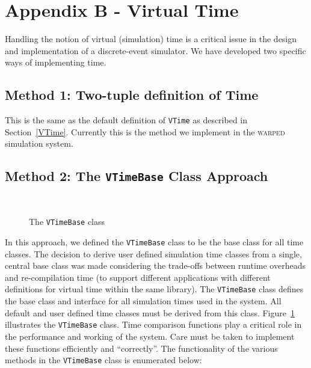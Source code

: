 \documentclass[11pt]{article}
\begin{document}
\newpage
\section*{Appendix B - Virtual Time}\label{vtime}

Handling the notion of virtual (simulation) time is a critical issue in
the design and implementation of a discrete-event simulator. We have
developed two specific ways of implementing time.

\subsection*{Method 1: Two-tuple definition of Time}

This is the same as the default definition of {\tt VTime} as described in
Section~\ref{VTime}. Currently this is the method we implement in the
\textsc{warped} simulation system. 

\subsection*{Method 2: The {\tt VTimeBase} Class Approach}

\begin{figure}
\begin{center}
\ 
\end{center}
\caption{The {\tt VTimeBase} class}\label{fig:VTimeBase}
\end{figure}

In this approach, we defined the {\tt VTimeBase} class to be the base
class for all time classes.  The decision to derive user defined
simulation time classes from a single, central base class was made
considering the trade-offs between runtime overheads and re-compilation
time (to support different applications with different definitions for
virtual time within the same library).  The {\tt VTimeBase} class defines
the base class and interface for all simulation times used in the
system. All default and user defined time classes must be derived from
this class. Figure~\ref{fig:VTimeBase} illustrates the {\tt VTimeBase}
class.  Time comparison functions play a critical role in the performance
and working of the system. Care must be taken to implement these functions
efficiently and ``correctly''.  The functionality of the various methods
in the {\tt VTimeBase} class is enumerated below:
\end{document}
